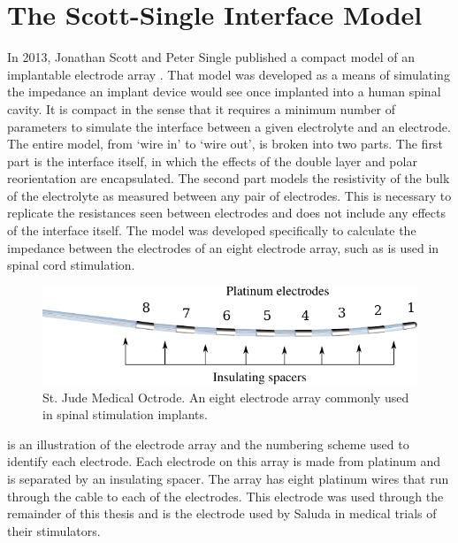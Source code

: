 
\section{The Scott-Single Interface Model}
  In 2013, Jonathan Scott and Peter Single published a compact model of an implantable electrode array \cite{ScottSingle2013}.
  That model was developed as a means of simulating the impedance an implant device would see once implanted into a human spinal cavity.
  It is compact in the sense that it requires a minimum number of parameters to simulate the interface between a given electrolyte and an electrode.
  The entire model, from `wire in' to `wire out', is broken into two parts.
  The first part is the interface itself, in which the effects of the double layer and polar reorientation are encapsulated.
  The second part models the resistivity of the bulk of the electrolyte as measured between any pair of electrodes.
  This is necessary to replicate the resistances seen between electrodes and does not include any effects of the interface itself.
  The model was developed specifically to calculate the impedance between the electrodes of an eight electrode array, such as is used in spinal cord stimulation.

  \begin{figure}
    \centering
    \includegraphics{content/pt2/07-InterfaceModel/graphics/StJudeOctrodeDiagram}
    \caption{\label{fig:StJudeOctrode_Labelled}St. Jude Medical Octrode. An eight electrode array commonly used in spinal stimulation implants.}
  \end{figure}

   is an illustration of the electrode array and the numbering scheme used to identify each electrode.
  Each electrode on this array is made from platinum and is separated by an insulating spacer.
  The array has eight platinum wires that run through the cable to each of the electrodes.
  This electrode was used through the remainder of this thesis and is the electrode used by Saluda in medical trials of their stimulators.


